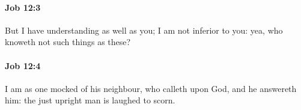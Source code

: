 		\paragraph{Job 12:3} %
			\label{JOB-12-3}

			But I have understanding as well as you; I am not inferior to you: yea, who knoweth not such things as these?


		\paragraph{Job 12:4} %
			\label{JOB-12-4}

			I am as one mocked of his neighbour, who calleth upon God, and he answereth him: the just upright man is laughed to scorn.


